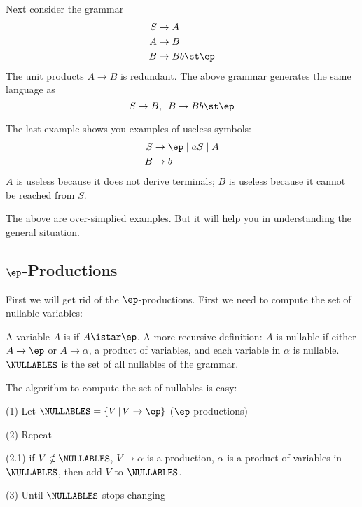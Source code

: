 \begin{eg}
Next consider the grammar
\begin{align*}
S &\rightarrow A \\
A &\rightarrow B \\
B &\rightarrow  Bb \st \ep 
\end{align*}
The unit products $A \rightarrow B$ is redundant.
The above grammar generates the same language as 
\[
S \rightarrow B, \,\,\, B \rightarrow Bb \st \ep
\]
\end{eg}

\begin{eg}
The last example shows you examples of useless symbols:
\begin{align*}
S &\rightarrow \ep \mid aS \mid A \\
B &\rightarrow b
\end{align*}
$A$ is useless because it does not derive terminals; $B$ is useless 
because it cannot be reached from $S$.
\end{eg}

The above are over-simplied examples.
But it will help you in understanding the general situation.







\newpage
\subsection{$\ep$-Productions}

First we will get rid of the $\ep$-productions. First we need to
compute the set of nullable variables:


\begin{defn} A variable $A$ is  if $A \istar
\ep$. A more recursive definition: $A$ is nullable if either $A
\rightarrow \ep$ or $A \rightarrow \alpha$, a product of
variables, and each variable in $\alpha$ is nullable.
$\NULLABLES$ is the set of all nullables of the grammar.
\end{defn}

The algorithm to compute the set of nullables is easy:
\begin{mylist}
 \item[(1)] Let $\NULLABLES = \{V \,|\, V\rightarrow \ep\}$
 ($\ep$-productions)
 \item[(2)] Repeat
 \begin{mylist}
  \item[(2.1)] if $V \notin \NULLABLES$, $V \rightarrow
  \alpha$ is a production, $\alpha$
  is a product of variables in $\NULLABLES$,
  then add $V$ to $\NULLABLES$.
 \end{mylist}
 \item[(3)] Until $\NULLABLES$ stops changing
\end{mylist}


